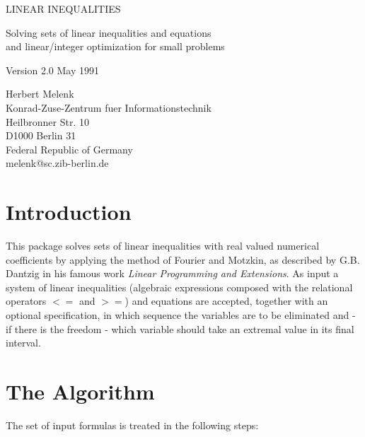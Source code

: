 
\begin{center} {\Large LINEAR INEQUALITIES} \end{center}
\begin{center} Solving sets of linear inequalities and equations \\
and linear/integer optimization for small problems \end{center}
\begin{center} Version 2.0 May 1991\end{center}

\begin{center} Herbert Melenk \\ Konrad-Zuse-Zentrum fuer
Informationstechnik \\
Heilbronner Str. 10 \\ D1000 Berlin 31 \\ Federal Republic of Germany \\ 
melenk@sc.zib-berlin.de \end{center}

\section{Introduction}

This package solves sets of linear inequalities with real valued numerical
coefficients by applying the method of Fourier and Motzkin, as described
by G.B. Dantzig in his famous work {\em Linear Programming and Extensions}.
As input a system of linear inequalities (algebraic expressions composed
with the relational operators $<=$ and $>=$) and equations are accepted,
together with an optional specification, in which sequence the variables
are to be eliminated and - if there is the freedom - which variable should
take an extremal value in its final interval.


\section{The Algorithm}
The set of input formulas is treated in the following steps:

